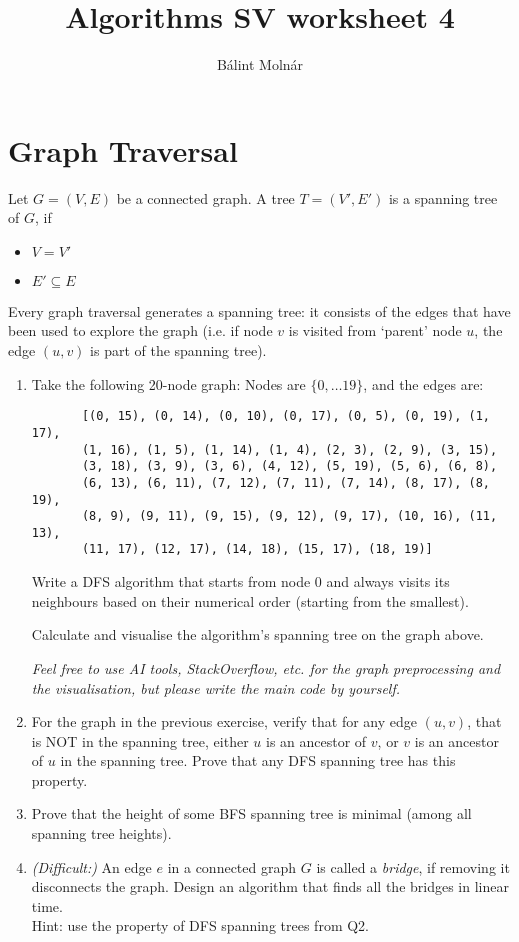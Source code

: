 \documentclass{article}
\title{{Algorithms SV worksheet 4}}
\author{Bálint Molnár}
\begin{document}
\maketitle


\section{Graph Traversal}

     Let $G=(V,E)$ be a connected graph. A tree $T=(V',E')$ is a spanning tree of $G$, if
    \begin{itemize}
        \item $V=V'$
        \item $E' \subseteq E$
    \end{itemize}


     Every graph traversal generates a spanning tree: it consists of the edges that have been used to explore the graph (i.e. if node $v$ is visited from `parent' node $u$, the edge $(u,v)$ is part of the spanning tree).
\begin{enumerate}
    \item
     
    

    
   Take the following 20-node graph: Nodes are $\{ 0,\dots 19\}$, and the edges are: 
   \begin{verbatim}
       [(0, 15), (0, 14), (0, 10), (0, 17), (0, 5), (0, 19), (1, 17),
       (1, 16), (1, 5), (1, 14), (1, 4), (2, 3), (2, 9), (3, 15),
       (3, 18), (3, 9), (3, 6), (4, 12), (5, 19), (5, 6), (6, 8),
       (6, 13), (6, 11), (7, 12), (7, 11), (7, 14), (8, 17), (8, 19),
       (8, 9), (9, 11), (9, 15), (9, 12), (9, 17), (10, 16), (11, 13),
       (11, 17), (12, 17), (14, 18), (15, 17), (18, 19)]
   \end{verbatim}

    Write a DFS algorithm that starts from node $0$ and always visits its neighbours based on their numerical order (starting from the smallest).

    Calculate and visualise the algorithm's spanning tree on the graph above.
   
    \emph{Feel free to use AI tools, StackOverflow, etc. for the graph preprocessing and the visualisation, but please write the main code by yourself.}
    \item For the graph in the previous exercise, verify that for any edge $(u,v)$, that is NOT in the spanning tree, either $u$ is an ancestor of $v$, or $v$ is an ancestor of $u$ in the spanning tree. Prove that any DFS spanning tree has this property.
    \item Prove that the height of \color{red}
        some
    \color{black} BFS spanning tree is minimal (among all spanning tree heights).
    \item \emph{(Difficult:)} An edge $e$ in a connected graph $G$ is called a \emph{bridge}, if removing it disconnects the graph. Design an algorithm that finds all the bridges in linear time.\\ Hint: use the property of DFS spanning trees from Q2.
\end{enumerate}
\end{document}
